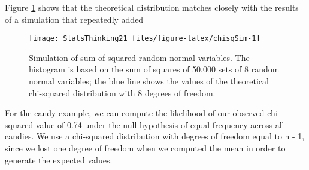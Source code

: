 \documentclass[]{book}
\newenvironment{Shaded}{\begin{snugshade}}{\end{snugshade}}
\newcommand{\KeywordTok}[1]{\textcolor[rgb]{0.13,0.29,0.53}{\textbf{#1}}}
\newcommand{\DataTypeTok}[1]{\textcolor[rgb]{0.13,0.29,0.53}{#1}}
\newcommand{\DecValTok}[1]{\textcolor[rgb]{0.00,0.00,0.81}{#1}}
\newcommand{\FloatTok}[1]{\textcolor[rgb]{0.00,0.00,0.81}{#1}}
\newcommand{\StringTok}[1]{\textcolor[rgb]{0.31,0.60,0.02}{#1}}
\newcommand{\CommentTok}[1]{\textcolor[rgb]{0.56,0.35,0.01}{\textit{#1}}}
\newcommand{\OtherTok}[1]{\textcolor[rgb]{0.56,0.35,0.01}{#1}}
\newcommand{\OperatorTok}[1]{\textcolor[rgb]{0.81,0.36,0.00}{\textbf{#1}}}
\newcommand{\NormalTok}[1]{#1}
\theoremstyle{definition}
\theoremstyle{definition}
\theoremstyle{definition}
\theoremstyle{remark}
\begin{document}
\begin{Shaded}
\end{Shaded}

Figure \ref{fig:chisqSim} shows that the theoretical distribution
matches closely with the results of a simulation that repeatedly added

\begin{figure}
\texttt{[image: StatsThinking21\_files/figure-latex/chisqSim-1]} \caption{Simulation of sum of squared random normal variables.   The histogram is based on the sum of squares of 50,000 sets of 8 random normal variables; the blue line shows the values of the theoretical chi-squared distribution with 8 degrees of freedom.}\label{fig:chisqSim}
\end{figure}

For the candy example, we can compute the likelihood of our observed
chi-squared value of 0.74 under the null hypothesis of equal frequency
across all candies. We use a chi-squared distribution with degrees of
freedom equal to n - 1, since we lost one degree of freedom when we
computed the mean in order to generate the expected values.

\begin{Shaded}
\end{Shaded}
\end{document}
